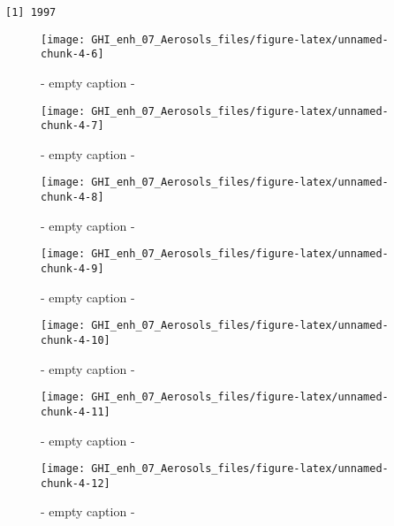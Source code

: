 \documentclass[
  10pt,
  a4paper,oneside]{article}
\begin{document}
\begin{verbatim}
[1] 1997
\end{verbatim}

\begin{figure}[H]

{\centering \texttt{[image: GHI\_enh\_07\_Aerosols\_files/figure-latex/unnamed-chunk-4-6]} 

}

\caption{ - empty caption - }\label{fig:unnamed-chunk-4-6}
\end{figure}
\begin{figure}[H]

{\centering \texttt{[image: GHI\_enh\_07\_Aerosols\_files/figure-latex/unnamed-chunk-4-7]} 

}

\caption{ - empty caption - }\label{fig:unnamed-chunk-4-7}
\end{figure}
\begin{figure}[H]

{\centering \texttt{[image: GHI\_enh\_07\_Aerosols\_files/figure-latex/unnamed-chunk-4-8]} 

}

\caption{ - empty caption - }\label{fig:unnamed-chunk-4-8}
\end{figure}
\begin{figure}[H]

{\centering \texttt{[image: GHI\_enh\_07\_Aerosols\_files/figure-latex/unnamed-chunk-4-9]} 

}

\caption{ - empty caption - }\label{fig:unnamed-chunk-4-9}
\end{figure}
\begin{figure}[H]

{\centering \texttt{[image: GHI\_enh\_07\_Aerosols\_files/figure-latex/unnamed-chunk-4-10]} 

}

\caption{ - empty caption - }\label{fig:unnamed-chunk-4-10}
\end{figure}
\begin{figure}[H]

{\centering \texttt{[image: GHI\_enh\_07\_Aerosols\_files/figure-latex/unnamed-chunk-4-11]} 

}

\caption{ - empty caption - }\label{fig:unnamed-chunk-4-11}
\end{figure}
\begin{figure}[H]

{\centering \texttt{[image: GHI\_enh\_07\_Aerosols\_files/figure-latex/unnamed-chunk-4-12]} 

}

\caption{ - empty caption - }\label{fig:unnamed-chunk-4-12}
\end{figure}
\end{document}
